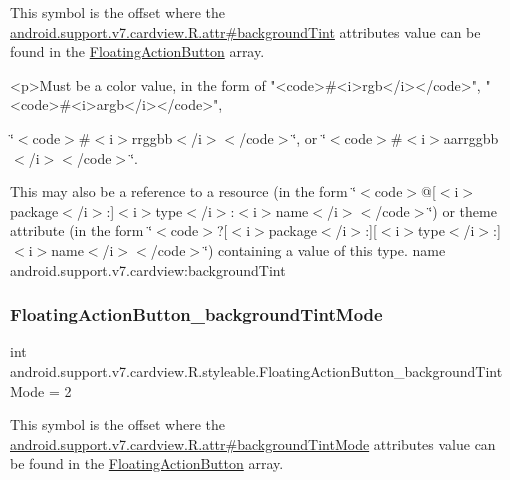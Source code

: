 This symbol is the offset where the \hyperlink{classandroid_1_1support_1_1v7_1_1cardview_1_1R_1_1attr_ab937a9e918e0058bdb22175c79c80b62}{android.\+support.\+v7.\+cardview.\+R.\+attr\#background\+Tint} attribute\textquotesingle{}s value can be found in the \hyperlink{classandroid_1_1support_1_1v7_1_1cardview_1_1R_1_1styleable_a1be8c9bcabd399162362befcccf73f59}{Floating\+Action\+Button} array.

\begin{DoxyVerb}      <p>Must be a color value, in the form of "<code>#<i>rgb</i></code>", "<code>#<i>argb</i></code>",
\end{DoxyVerb}
 \char`\"{}$<$code$>$\#$<$i$>$rrggbb$<$/i$>$$<$/code$>$\char`\"{}, or \char`\"{}$<$code$>$\#$<$i$>$aarrggbb$<$/i$>$$<$/code$>$\char`\"{}. 

This may also be a reference to a resource (in the form \char`\"{}$<$code$>$@\mbox{[}$<$i$>$package$<$/i$>$\+:\mbox{]}$<$i$>$type$<$/i$>$\+:$<$i$>$name$<$/i$>$$<$/code$>$\char`\"{}) or theme attribute (in the form \char`\"{}$<$code$>$?\mbox{[}$<$i$>$package$<$/i$>$\+:\mbox{]}\mbox{[}$<$i$>$type$<$/i$>$\+:\mbox{]}$<$i$>$name$<$/i$>$$<$/code$>$\char`\"{}) containing a value of this type.  name android.\+support.\+v7.\+cardview\+:background\+Tint \mbox{\label{classandroid_1_1support_1_1v7_1_1cardview_1_1R_1_1styleable_a7823af4317af3e74f9d2ed0b009312aa}} 
\subsubsection{\texorpdfstring{Floating\+Action\+Button\+\_\+background\+Tint\+Mode}{FloatingActionButton\_backgroundTintMode}}
{\footnotesize\ttfamily int android.\+support.\+v7.\+cardview.\+R.\+styleable.\+Floating\+Action\+Button\+\_\+background\+Tint\+Mode = 2\hspace{0.3cm}{\ttfamily [static]}}

This symbol is the offset where the \hyperlink{classandroid_1_1support_1_1v7_1_1cardview_1_1R_1_1attr_afb91022bf77beda3662ed71a44e449a0}{android.\+support.\+v7.\+cardview.\+R.\+attr\#background\+Tint\+Mode} attribute\textquotesingle{}s value can be found in the \hyperlink{classandroid_1_1support_1_1v7_1_1cardview_1_1R_1_1styleable_a1be8c9bcabd399162362befcccf73f59}{Floating\+Action\+Button} array.

